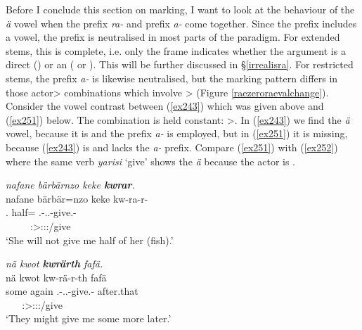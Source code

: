 Before I conclude this section on  marking, I want to look at the behaviour of the \emph{ä} vowel when the  prefix \emph{ra-} and  prefix \emph{a-} come together. Since the  prefix includes a vowel, the  prefix is neutralised in most parts of the paradigm. For extended stems, this  is complete, i.e. only the  frame indicates whether the  argument is a direct  (\Abs{}) or an  (\Dat{} or \Poss{}). This will be further discussed in \S{}\ref{irrealisra}. For restricted stems, the  prefix \emph{a-} is likewise neutralised, but the  marking pattern differs in those actor> combinations which involve \Sg>\Sg{} (Figure \ref{raezeroraevalchange}). Consider the vowel contrast between (\ref{ex243}) which was given above and (\ref{ex251}) below. The  combination is held constant: \Tsg>\Fsg{}. In (\ref{ex243}) we find the \emph{ä} vowel, because it is  and the  prefix \emph{a-} is employed, but in (\ref{ex251}) it is missing, because (\ref{ex243}) is  and lacks the \emph{a-} prefix. Compare (\ref{ex251}) with (\ref{ex252}) where the same verb \emph{yarisi} `give' shows the \emph{ä} because the actor  is .

\begin{exe}
	\ex \emph{nafane bärbärnzo keke \textbf{kwrar}.}\\
	\glll nafane {bärbär=nzo} keke kw-ra-r-\Zero\\
	\Tsg.\Poss{} {half=\Only} \Neg{} \Fsg.\Bet{}-\Irr.\Ndu.\Vc-give.\Rs-\Stsg\\
	~ ~ ~ {\Stsg:\Sbj>\Fsg:\Io:\Irr:\Pfv/give}\\
	\trans `She will not give me half of her (fish).' 
	\label{ex251}
\end{exe}
\begin{exe}
	\ex \emph{nä kwot \textbf{kwrärth} fafä.}\\
	\glll nä kwot kw-rä-r-th fafä\\
	some again \Fsg.\Bet-\Irr.\Pl.\Vc-give.\Rs-\Stnsg{} after.that\\
	~ ~ {\Stpl:\Sbj>\Fsg:\Io:\Irr:\Pfv/give} ~\\
	\trans `They might give me some more later.' 
	\label{ex252}
\end{exe}

